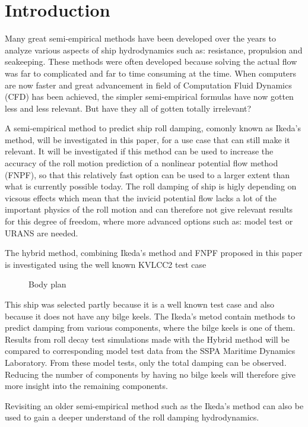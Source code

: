 \section{Introduction}\label{introduction}

Many great semi-empirical methods have been developed over the years to
analyze various aspects of ship hydrodynamics such as: resistance,
propulsion and seakeeping. These methods were often developed because
solving the actual flow was far to complicated and far to time consuming
at the time. When computers are now faster and great advancement in
field of Computation Fluid Dynamics (CFD) has been achieved, the simpler
semi-empirical formulas have now gotten less and less relevant. But have
they all of gotten totally irrelevant?

A semi-empirical method to predict ship roll damping, comonly known as
Ikeda's method, will be investigated in this paper, for a use case that
can still make it relevant. It will be investigated if this method can
be used to increase the accuracy of the roll motion prediction of a
nonlinear potential flow method (FNPF), so that this relatively fast
option can be used to a larger extent than what is currently possible
today. The roll damping of ship is higly depending on vicsous effects
which mean that the invicid potential flow lacks a lot of the important
physics of the roll motion and can therefore not give relevant results
for this degree of freedom, where more advanced options such as: model
test or URANS are needed.

The hybrid method, combining Ikeda's method and FNPF proposed in this
paper is investigated using the well known KVLCC2 test case
 
            
    
    \begin{figure}
        \begin{center}\end{center}
        \caption{Body plan}
        \label{fig:body_plan}
    \end{figure}
    

    This ship was selected partly because it is a well known test case and
also because it does not have any bilge keels. The Ikeda's metod contain
methods to predict damping from various components, where the bilge
keels is one of them. Results from roll decay test simulations made with
the Hybrid method will be compared to corresponding model test data from
the SSPA Maritime Dynamics Laboratory. From these model tests, only the
total damping can be observed. Reducing the number of components by
having no bilge keels will therefore give more insight into the
remaining components.

Revisiting an older semi-empirical method such as the Ikeda's method can
also be used to gain a deeper understand of the roll damping
hydrodynamics.

    